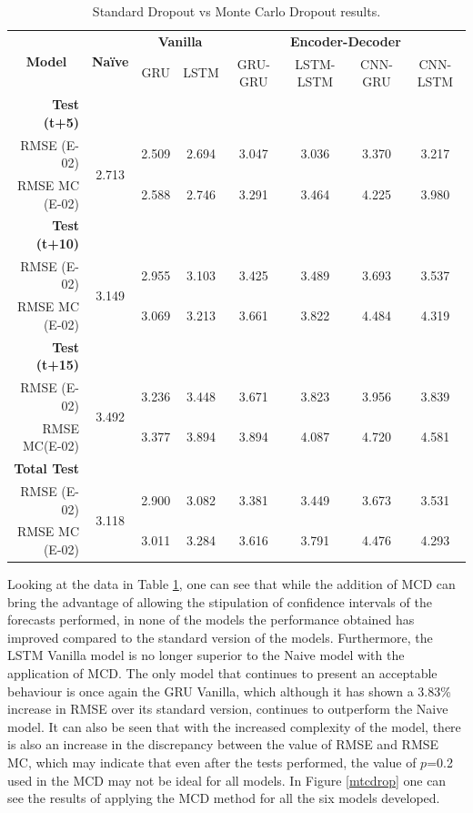 \begin{table}[htbp]
  \centering
  \caption{Standard Dropout vs Monte Carlo Dropout results.}
    \begin{tabular}{r|c|cc|cccc}
    \multicolumn{1}{c|}{\multirow{2}[1]{*}{\textbf{Model}}} & \multirow{2}[1]{*}{\textbf{Naïve}} & \multicolumn{2}{c|}{\textbf{Vanilla}} & \multicolumn{4}{c}{\textbf{Encoder-Decoder}} \\
      &   & GRU & LSTM & GRU-GRU & LSTM-LSTM & CNN-GRU & CNN-LSTM \\
    \midrule
    \textbf{Test (t+5)} &   &   &   &   &   &   &  \\
    RMSE (E-02) & \multirow{2}[0]{*}{2.713} & 2.509 & 2.694 & 3.047 & 3.036 & 3.370 & 3.217 \\
    RMSE MC (E-02) &   & 2.588 & 2.746 & 3.291 & 3.464 & 4.225 & 3.980 \\
    \textbf{Test (t+10)} &   &   &   &   &   &   &  \\
    RMSE (E-02) & \multirow{2}[0]{*}{3.149} & 2.955 & 3.103 & 3.425 & 3.489 & 3.693 & 3.537 \\
    RMSE MC (E-02) &   & 3.069 & 3.213 & 3.661 & 3.822 & 4.484 & 4.319 \\
    \textbf{Test (t+15)} &   &   &   &   &   &   &  \\
    RMSE (E-02) & \multirow{2}[1]{*}{3.492} & 3.236 & 3.448 & 3.671 & 3.823 & 3.956 & 3.839 \\
    RMSE MC(E-02) &   & 3.377 & 3.894 & 3.894 & 4.087 & 4.720 & 4.581 \\
    \midrule
    \textbf{Total Test} &   &   &   &   &   &   &  \\
    RMSE (E-02) & \multirow{2}[0]{*}{3.118} & 2.900 & 3.082 & 3.381 & 3.449 & 3.673 & 3.531 \\
    RMSE MC (E-02) &   & 3.011 & 3.284 & 3.616 & 3.791 & 4.476 & 4.293 \\
    \end{tabular}%
  \label{tab:mctab}%
\end{table}%

Looking at the data in Table \ref{tab:mctab}, one can see that while the addition of \ac{MCD} can bring the advantage of allowing the stipulation of confidence intervals of the forecasts performed, in none of the models the performance obtained has improved compared to the standard version of the models. Furthermore, the \ac{LSTM} Vanilla model is no longer superior to the Naive model with the application of \ac{MCD}. The only model that continues to present an acceptable behaviour is once again the \ac{GRU} Vanilla, which although it has shown a 3.83\% increase in \ac{RMSE} over its standard version, continues to outperform the Naive model. It can also be seen that with the increased complexity of the model, there is also an increase in the discrepancy between the value of \ac{RMSE} and \ac{RMSE} MC, which may indicate that even after the tests performed, the value of $p$=0.2 used in the \ac{MCD} may not be ideal for all models. In Figure \ref{mtcdrop} one can see the results of applying the \ac{MCD} method for all the six models developed.

